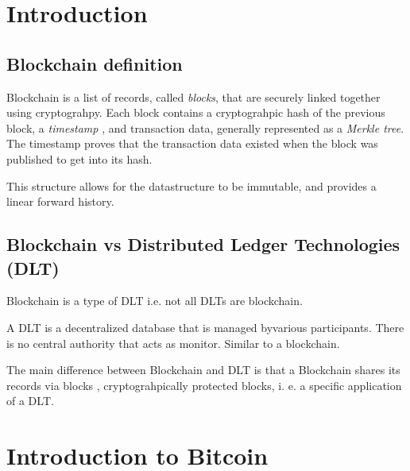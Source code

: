 \documentclass[a4paper, 12pt]{report}
\begin{document}
\chapter{Introduction}
\section{Blockchain definition}
Blockchain is a list of records, called \textit{blocks}, that are securely linked together
using cryptograhpy. Each block contains a cryptograhpic hash of the previous block, a \textit{timestamp}
, and transaction data, generally represented as a \textit{Merkle tree}. The timestamp proves
that the transaction data existed when the block was published to get into its hash.

This structure allows for the datastructure to be immutable, and provides a linear forward history.
\section{Blockchain vs Distributed Ledger Technologies (DLT)}
Blockchain is a type of DLT i.e. not all DLTs are blockchain.

A DLT is a decentralized database that is managed byvarious participants. There is no central
authority that acts as monitor. Similar to a blockchain.

The main difference between Blockchain and DLT is that a Blockchain shares its records via blocks
, cryptograhpically protected blocks, i. e. a specific application of a DLT.

\chapter{Introduction to Bitcoin}
\end{document}
